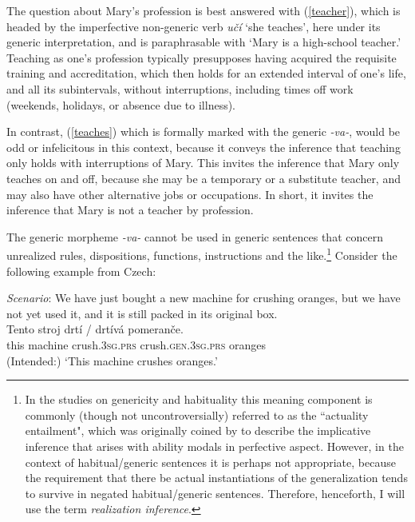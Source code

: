\documentclass[output=paper,colorlinks,citecolor=brown]{langscibook}
\begin{document}
\noindent
The question about Mary's profession is best answered with (\ref{teacher}), which is headed by the imperfective non-generic verb \textit{učí} `she teaches', here under its generic interpretation, and is paraphrasable with `Mary is a high-school teacher.' Teaching as one's profession
typically presupposes having acquired the requisite training
and accreditation, which then holds for an extended interval of one's life,
and all its subintervals, without interruptions, including times off work (weekends, holidays, or absence due to illness).

In contrast, (\ref{teaches}) which is formally marked with the generic \textit{-va-}, would be odd or infelicitous in this context, because it conveys the inference that
teaching only holds with interruptions of Mary. This invites the inference that
Mary only teaches on and off, because she
may be a temporary or a substitute teacher, and may also have other alternative jobs or occupations. In short, it invites the inference that Mary is not a teacher by profession.




The generic morpheme \textit{-va-} cannot be used
in generic sentences that concern unrealized rules, dispositions, functions, instructions and the like.\footnote{In the studies on genericity and habituality this meaning component is commonly (though not uncontroversially) referred to as the ``actuality entailment", which was originally coined by \citet{bhatt1999covert} to describe the implicative inference that arises with ability modals in perfective aspect. However, in the context of
habitual/generic sentences it is perhaps not appropriate, because the requirement that there be actual instantiations of the generalization tends to survive in negated habitual/generic sentences. Therefore, henceforth, I will use the term \textit{realization inference}.}
Consider the following example from Czech:

\eanoraggedright\label{crushoranges}
\textit{Scenario}: We have just bought a new machine for crushing oranges, but
we have not yet used it, and it is still packed in its original box.\smallskip\\
\gll Tento stroj   drtí  / \minsp{\#} drtívá  	pomeranče.\\
this machine  crush.\textsc{3sg.prs} {} {} crush.\textsc{gen.3sg.prs}	oranges\\
\glt (Intended:) `This machine crushes oranges.'
\z
\end{document}
